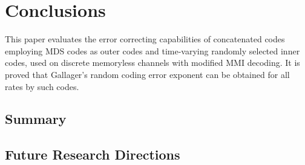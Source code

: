 \chapter{Conclusions}
This paper evaluates the error 
correcting capabilities of concatenated codes 
employing MDS codes as outer codes and
time-varying randomly selected inner codes,
used on discrete memoryless channels with modified MMI
decoding. It is proved that 
Gallager's random coding error exponent
can be obtained for all rates by such codes.
\section{Summary}
\section{Future Research Directions}